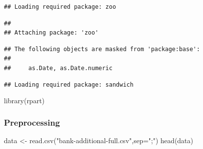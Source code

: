 \documentclass[
]{article}
\newenvironment{Shaded}{\begin{snugshade}}{\end{snugshade}}
\newcommand{\AttributeTok}[1]{\textcolor[rgb]{0.77,0.63,0.00}{#1}}
\newcommand{\FunctionTok}[1]{\textcolor[rgb]{0.00,0.00,0.00}{#1}}
\newcommand{\NormalTok}[1]{#1}
\newcommand{\OtherTok}[1]{\textcolor[rgb]{0.56,0.35,0.01}{#1}}
\newcommand{\StringTok}[1]{\textcolor[rgb]{0.31,0.60,0.02}{#1}}
\begin{document}
\begin{verbatim}
## Loading required package: zoo
\end{verbatim}

\begin{verbatim}
## 
## Attaching package: 'zoo'
\end{verbatim}

\begin{verbatim}
## The following objects are masked from 'package:base':
## 
##     as.Date, as.Date.numeric
\end{verbatim}

\begin{verbatim}
## Loading required package: sandwich
\end{verbatim}

\begin{Shaded}
\begin{Highlighting}[]
\FunctionTok{library}\NormalTok{(rpart)}
\end{Highlighting}
\end{Shaded}

\hypertarget{preprocessing}{%
\subsubsection{Preprocessing}\label{preprocessing}}

\begin{Shaded}
\begin{Highlighting}[]
\NormalTok{data }\OtherTok{\textless{}{-}} \FunctionTok{read.csv}\NormalTok{(}\StringTok{"bank{-}additional{-}full.csv"}\NormalTok{,}\AttributeTok{sep=}\StringTok{";"}\NormalTok{)}
\FunctionTok{head}\NormalTok{(data)}
\end{Highlighting}
\end{Shaded}
\end{document}
